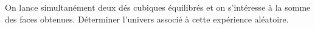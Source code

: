 
On lance simultanément deux dés cubiques équilibrés et on s'intéresse à la somme des faces obtenues. Déterminer l'univers associé à cette expérience aléatoire.